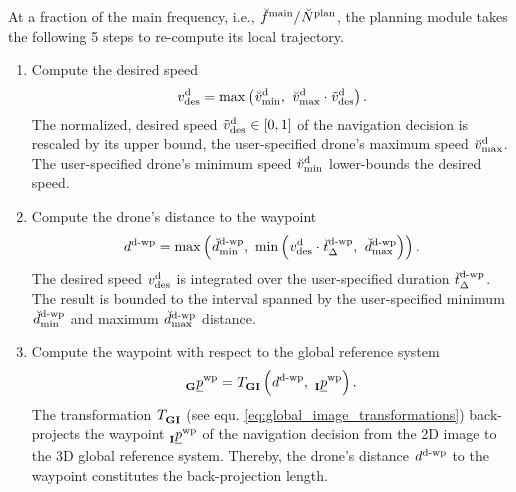 At a fraction of the main frequency, i.e.,
$\freq[\user]{\main}{}{}{} / \num[\user]{\text{plan}}{}{}{}$, 
the planning module takes the following 5 steps 
to re-compute its local trajectory.
\begin{enumerate}
    \item Compute the desired speed
    \begin{equation} \label{eq:planning_des_speed}
        \speed[]{\drone}{\desired}{}{}
        = 
        \maxof{
            \speed[\user]{\drone}{\mnm}{}{}
        }{
            \speed[\user]{\drone}{\mxm}{}{}
            \cdot 
            \speed[\norm]{\drone}{\desired}{}{}
        }.
    \end{equation}
    The normalized, desired speed 
    $\speed[\norm]{\drone}{\desired}{}{} \in \left[0, 1\right]$ 
    of the navigation decision
    is rescaled by its upper bound, 
    the user-specified drone's maximum speed 
    $\speed[\user]{\drone}{\mxm}{}{}$.    
    The user-specified drone's minimum speed 
    $\speed[\user]{\drone}{\mnm}{}{}$
    lower-bounds the desired speed.

    \item Compute the drone's distance to the waypoint 
    \begin{equation}
        \dist[]{\dronetowayp}{}{}{}
        = 
        \maxof{
            \dist[\user]{\dronetowayp}{\mnm}{}{}
        }{
            \minof{
                \speed[]{\drone}{\desired}{}{}
                \cdot
                \dur[\user]{\dronetowayp}{}{}{}
            }{
                \dist[\user]{\dronetowayp}{\mxm}{}{}
            }
        }.
    \end{equation}
    The desired speed 
    $\speed[]{\drone}{\desired}{}{}$ 
    is integrated over the user-specified duration
    $\dur[\user]{\dronetowayp}{}{}{}$.
    The result is bounded to the interval spanned 
    by the user-specified minimum
    $\dist[\user]{\dronetowayp}{\mnm}{}{}$
    and maximum
    $\dist[\user]{\dronetowayp}{\mxm}{}{}$
    distance.

    \item Compute the waypoint with respect to the global reference system
    \begin{equation} \label{eq:pl_global_wayp}
        \pos[]{\wayp}{}{\grs}{}
        = 
        \trafo[]{}{\grs\irs}{}{} \left(
            \dist[]{\dronetowayp}{}{}{}
            ,\ 
            \pos[]{\wayp}{}{\irs}{}
        \right).
    \end{equation}
    The transformation
    $\trafo[]{}{\grs\irs}{}{}$
    (see equ. \ref{eq:global_image_transformations})
    back-projects the waypoint
    $\pos[]{\wayp}{}{\irs}{}$ 
    of the navigation decision
    from the 2D image to the 3D global reference system.
    Thereby, the drone's distance 
    $\dist[]{\dronetowayp}{}{}{}$
    to the waypoint
    constitutes the back-projection length.
    

\end{enumerate}
